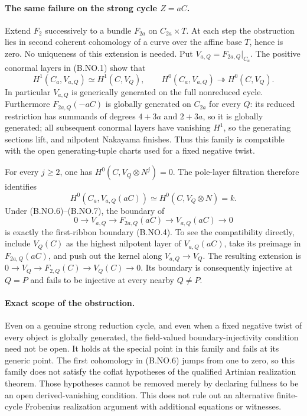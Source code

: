\paragraph{The same failure on the strong cycle $Z=aC$.}
Extend $F_2$ successively to a bundle $F_{2a}$ on $C_{2a}\times T$.
At each step the obstruction lies in second coherent cohomology
of a curve over the affine base $T$, hence is zero. No uniqueness
of this extension is needed. Put $V_{a,Q}=F_{2a,Q}|_{C_a}$.
The positive conormal layers in (B.NO.1) show that
\[
 H^1(C_a,V_{a,Q})\simeq H^1(C,V_Q),\qquad
 H^0(C_a,V_{a,Q})\twoheadrightarrow H^0(C,V_Q).            \tag{B.NO.6}
\]
In particular $V_{a,Q}$ is generically generated on the full
nonreduced cycle. Furthermore $F_{2a,Q}(-aC)$ is globally
generated on $C_{2a}$ for every $Q$: its reduced restriction
has summands of degrees $4+3a$ and $2+3a$, so it is globally
generated; all subsequent conormal layers have vanishing $H^1$,
so the generating sections lift, and nilpotent Nakayama finishes.
Thus this family is compatible with the open generating-tuple
charts used for a fixed negative twist.

For every $j\geq2$, one has $H^0(C,V_Q\otimes N^j)=0$.
The pole-layer filtration therefore identifies
\[
 H^0(C_a,V_{a,Q}(aC))\simeq H^0(C,V_Q\otimes N)=k.
                                                               \tag{B.NO.7}
\]
Under (B.NO.6)--(B.NO.7), the boundary of
\[
 0\longrightarrow V_{a,Q}\longrightarrow F_{2a,Q}(aC)
    \longrightarrow V_{a,Q}(aC)\longrightarrow0
\]
is exactly the first-ribbon boundary (B.NO.4). To see the
compatibility directly, include $V_Q(C)$ as the highest
nilpotent layer of $V_{a,Q}(aC)$, take its preimage in
$F_{2a,Q}(aC)$, and push out the kernel along
$V_{a,Q}\to V_Q$. The resulting extension is
$0\to V_Q\to F_{2,Q}(C)\to V_Q(C)\to0$.
Its boundary is consequently injective at $Q=P$ and fails
to be injective at every nearby $Q\ne P$.

\paragraph{Exact scope of the obstruction.}
Even on a genuine strong reduction cycle, and even when a fixed
negative twist of every object is globally generated, the
field-valued boundary-injectivity condition need not be open.
It holds at the special point in this family and fails at its
generic point. The first cohomology in (B.NO.6) jumps from one
to zero, so this family does not satisfy the coflat hypotheses
of the qualified Artinian realization theorem. Those hypotheses
cannot be removed merely by declaring fullness to be an open
derived-vanishing condition. This does not rule out an alternative
finite-cycle Frobenius realization argument with additional
equations or witnesses.
